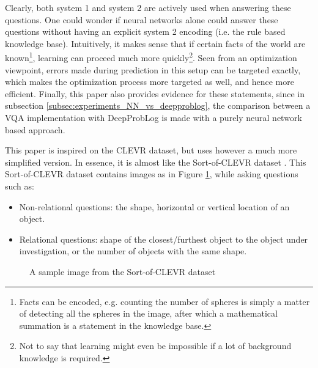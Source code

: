 \documentclass[english]{sobraep}
\begin{document}
Clearly, both system 1 and system 2 are actively used when answering these questions. One could wonder if neural networks alone could answer these questions without having an explicit system 2 encoding (i.e. the rule based knowledge base). Intuitively, it makes sense that if certain facts of the world are known\footnote{Facts can be encoded, e.g. counting the number of spheres is simply a matter of detecting all the spheres in the image, after which a mathematical summation is a statement in the knowledge base.}, learning can proceed much more quickly\footnote{Not to say that learning might even be impossible if a lot of background knowledge is required.}. Seen from an optimization viewpoint, errors made during prediction in this setup can be targeted exactly, which makes the optimization process more targeted as well, and hence more efficient. Finally, this paper also provides evidence for these statements, since in subsection \ref{subsec:experiments_NN_vs_deepproblog}, the comparison between a VQA implementation with DeepProbLog is made with a purely neural network based approach. 

This paper is inspired on the CLEVR dataset, but uses however a much more simplified version. In essence, it is almost like the Sort-of-CLEVR dataset \cite{sort_of_clevr_dataset}. This Sort-of-CLEVR dataset contains images as in Figure \ref{fig:sample_image_sort_of_clevr}, while asking questions such as:
\begin{itemize}
    \item Non-relational questions: the shape, horizontal or vertical location of an object.
    \item Relational questions: shape of the closest/furthest object to the object under investigation, or the number of objects with the same shape.
\end{itemize}

\begin{figure}[htp]
    \begin{center}
    \captionsetup{justification=centering}
    \caption{A sample image from the Sort-of-CLEVR dataset \cite{sort_of_clevr_dataset}}
    \label{fig:sample_image_sort_of_clevr}
    \end{center}
\end{figure}
\end{document}
